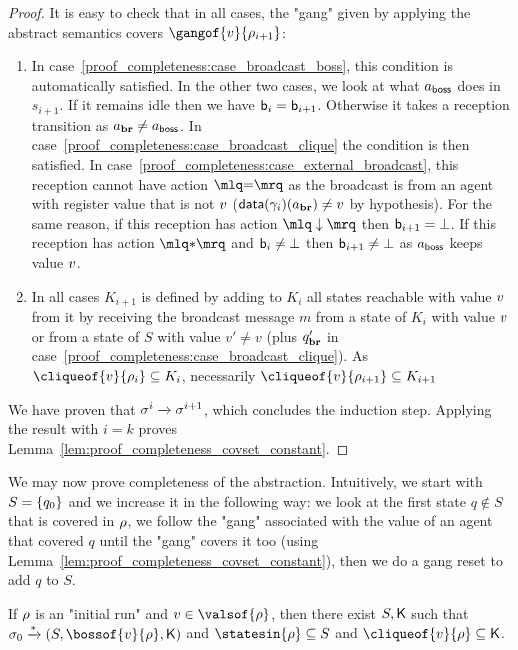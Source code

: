 \begin{proof}
	It is easy to check that in all cases, the "gang" given by applying the abstract semantics covers $\gangof{\aval}{\run_{i+1}}$:
	
	
	\begin{enumerate}[label = (\arabic*)]
		
		\item In case~\ref{proof_completeness:case_broadcast_boss}, this condition is automatically satisfied. In the other two cases, we look at what $a_{\mathsf{boss}}$ does in $s_{i+1}$. If it remains idle then we have $\mathsf{b}_i = \mathsf{b}_{i+1}$. Otherwise it takes a reception transition as $a_{\textbf{br}} \ne a_{\mathsf{boss}}$. In case~\ref{proof_completeness:case_broadcast_clique} the condition is then satisfied.
		In case~\ref{proof_completeness:case_external_broadcast}, this reception cannot have action $\quotemarks{\eqtestact}$ as the broadcast is from an agent with register value that is not $v$ ($\mathsf{data}(\gamma_i)(a_{\textbf{br}}) \ne v$ by hypothesis). For the same reason, if this reception has action $\quotemarks{\enregact}$ then $\mathsf{b}_{i+1}= \bot$. If this reception has action $\quotemarks{\dummyact}$ and $\mathsf{b}_i \ne \bot$ then $\mathsf{b}_{i+1} \ne \bot$ as $a_{\mathsf{boss}}$ keeps value $v$.
		
		\item In all cases $K_{i+1}$ is defined by adding to $K_i$ all states reachable with value $v$ from it by receiving the broadcast message $m$ from a state of $K_i$ with value $v$ or from a state of $S$ with value $v' \neq v$ (plus $q_{\textbf{br}}'$ in case~\ref{proof_completeness:case_broadcast_clique}). As $\cliqueof{\aval}{\run_i} \subseteq K_i$, necessarily  $\cliqueof{\aval}{\run_{i+1}} \subseteq K_{i+1}$
	\end{enumerate}
	
	We have proven that $\sigma^i \xrightarrow{} \sigma^{i+1}$, which concludes the induction step. Applying the result with $i = k$ proves Lemma~\ref{lem:proof_completeness_covset_constant}. 
\end{proof}

We may now prove completeness of the abstraction. Intuitively, we start with $S= \{q_0\}$ and we increase it in the following way: we look at the first state $q \notin S$ that is covered in $\rho$, we follow the "gang" associated with the value of an agent that covered $q$ until the "gang" covers it too (using Lemma~\ref{lem:proof_completeness_covset_constant}), then we do a gang reset to add $q$ to $S$. 

\begin{lemma}
	\label{lem:abstraction_complete}
	If $\rho$ is an "initial run" and $\aval \in \valsof{\run}$, then there exist $S, \mathsf{K}$ such that $\aconfiginit \step{*} (S, \bossof{\aval}{\run}, \clique)$ and $\statesin{\run} \subseteq S$ and $\cliqueof{\aval}{\run} \subseteq \clique$. 
\end{lemma}

